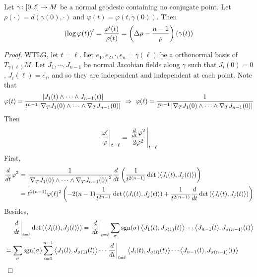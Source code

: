 \begin{enumerate}[label=\arabic{*}]
	\begin{lem}
		Let $\gamma \colon [0,\ell] \rightarrow M$ be a normal geodesic containing no conjugate point. Let $\rho(\cdot) = d(\gamma(0),\cdot)$ and $\varphi(t) = \varphi(t,\dot{\gamma}(0))$. Then
		\begin{equation*}
			\left(\log \varphi(t) \right)^\prime= \frac{\varphi^\prime(t)}{\varphi(t)} = \left(\Delta \rho - \frac{n-1}{\rho}\right)(\gamma(t))
		\end{equation*}
	\end{lem}
	\begin{proof}
		WTLG, let $t = \ell$. Let $e_1,e_2,\cdot,e_n = \dot{\gamma}(\ell)$ be a orthonormal basis of $T_{\gamma(\ell)}M$. Let $J_1,\cdots,J_{n-1}$ be normal Jacobian fields along $\gamma$ such that $J_i(0) = 0$, $J_i(\ell) = e_i$, and so they are independent and independent at each point.
		Note that
		\begin{equation*}
			\varphi(t) = \frac{\left\lvert J_1(t)\wedge \cdots \wedge J_{n-1}(t)\right\lvert}{t^{n-1}\left\lvert\nabla_TJ_1(0)\wedge \cdots \wedge \nabla_TJ_{n-1}(0)\right\lvert} ~\Rightarrow~ \varphi(\ell) = \frac{1}{\ell^{n-1}\left\lvert\nabla_TJ_1(0)\wedge \cdots \wedge \nabla_TJ_{n-1}(0)\right\lvert}
		\end{equation*}
		Then
		\begin{equation*}
			\left.\frac{\varphi^\prime}{\varphi}\right\lvert_{t=\ell} = \left.\frac{\frac{d}{dt}\varphi^2}{2\varphi^2}\right\lvert_{t=\ell}
		\end{equation*}
		First,
		\begin{equation*}
			\begin{aligned}
				\frac{d}{dt}\varphi^2 & = \frac{1}{\left\lvert\nabla_TJ_1(0)\wedge \cdots \wedge \nabla_TJ_{n-1}(0)\right\lvert^2}\frac{d}{dt} \left(\frac{1}{t^{2(n-1)}} \det \left(\left\langle J_i(t),J_j(t) \right\rangle\right)\right) \\
				&= \ell^{2(n-1)}\varphi(\ell)^2\left(-2(n-1)\frac{1}{t^{2n-1}}\det \left(\left\langle J_i(t),J_j(t) \right\rangle\right) + \frac{1}{t^{2(n-1)}} \frac{d}{dt}\det \left(\left\langle J_i(t),J_j(t) \right\rangle\right)\right)
			\end{aligned}
		\end{equation*}
		Besides,
		\begin{equation*}
			\begin{aligned}
				&\quad\lv{\frac{d}{dt}}_{t=\ell}\det \bc{\inn{J_i(t),J_j(t)}} = \lv{\frac{d}{dt}}_{t=\ell}\sum_\sigma \op{sgn}(\sigma)\inn{J_1(t),J_{\sigma(1)}(t)}\cdots\inn{J_{n-1}(t),J_{\sigma(n-1)}(t)}\\
				&= \sum_\sigma \op{sgn}(\sigma) \sum_{i=1}^{n-1}\inn{J_1(l),J_{\sigma(1)}(l)}\cdots \lv{\frac{d}{dt}}_{t=\ell} \inn{J_i(t),J_{\sigma(i)}(t)} \cdots\inn{J_{n-1}(l),J_{\sigma(n-1)}(l)} \\

\end{aligned}
\end{equation*}
\end{proof}
\end{enumerate}
